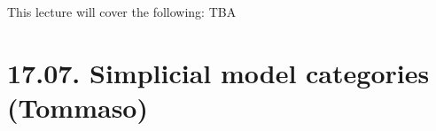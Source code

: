 \documentclass[a4paper]{amsart}
\numberwithin{figure}{section}
\theoremstyle{theorem}
\theoremstyle{definition}
\begin{document}
This lecture will cover the following: TBA

%
%
%
%
%
%
%
%


\section{17.07. Simplicial model categories (Tommaso)}
%
%
%
%
%
%
%
%
%
%
\end{document}
